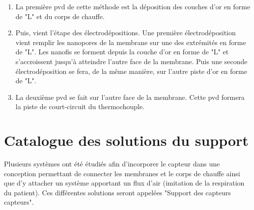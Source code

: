 \begin{itemize}
\begin{enumerate}[label=(\alph*), wide, labelwidth=!, labelindent = 0pt]
              \item La première \gls{pvd} de cette méthode est la déposition des couches d'or en forme de "L" et du corps de chauffe.\\
              \item Puis, vient l'étape des électrodépositions. Une première électrodéposition vient remplir les nanopores de la membrane sur une
                    des extrémités en forme de "L". Les nanofis se forment depuis la couche d'or en forme de "L" et s'accroissent jusqu'à 
                    atteindre l'autre face de la membrane. Puis une seconde électrodéposition se fera, de la même manière, sur l'autre piste d'or 
                    en forme de "L".\\
              \item La deuxième \gls{pvd} se fait sur l'autre face de la membrane. Cette \gls{pvd} formera la piste de court-circuit du thermochouple.
          \end{enumerate}
\end{itemize}

\newpage
\section{Catalogue des solutions du support}
\label{chap:catalogueSol}
Plusieurs systèmes ont été étudiés afin d'incorporer le capteur dans une conception permettant de connecter les membranes et le corps de chauffe
ainsi que d'y attacher un système apportant un flux d'air (imitation de la respiration du patient). Ces différentes solutions seront appelées
"Support des capteurs \gls{capteur}s".

